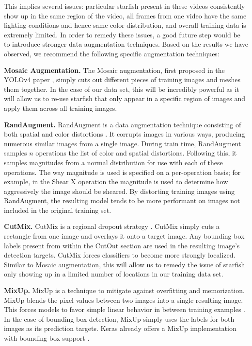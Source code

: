 \documentclass{article}
\begin{document}
This implies several issues: particular starfish present in these videos consistently show up in the same region of the video, all frames from one video have the same lighting conditions and hence same color distribution, and overall training data is extremely limited.
In order to remedy these issues, a good future step would be to introduce stronger data augmentation techniques.
Based on the results we have observed, we recommend the following specific augmentation techniques:

\textbf{Mosaic Augmentation.} The Mosaic augmentation, first proposed in the YOLOv4 paper \cite{yolov4}, simply cuts out different pieces of training images and meshes them together. In the case of our data set, this will be incredibly powerful as it will allow us to re-use starfish that only appear in a specific region of images and apply them across all training images.

\textbf{RandAugment.} RandAugment is a data augmentation technique consisting of both spatial and color distortions \cite{randaugment}. It corrupts images in various ways, producing numerous similar images from a single image.  During train time, RandAugment samples $n$ operations the list of color and spatial distortions.  Following this, it samples magnitudes from a normal distribution for use with each of these operations.  The way magnitude is used is specified on a per-operation basis; for example, in the Shear X operation the magnitude is used to determine how aggressively the image should be sheared.
By distorting training images using RandAugment, the resulting model tends to be more performant on images not included in the original training set.  

\textbf{CutMix.} CutMix is a regional dropout strategy \cite{cutmix}. CutMix simply cuts a rectangle from one image and overlays it onto a target image. Any bounding box labels present from within the CutOut section are used in the resulting image's detection targets. CutMix forces classifiers to become more strongly localized. Similar to Mosaic augmentation, this will allow us to remedy the issue of starfish only showing up in a limited number of locations in our training data set.

\textbf{MixUp.} MixUp is a technique to mitigate against overfitting and memorization. MixUp blends the pixel values between two images into a single resulting image. This forces models to favor simple linear behavior in between training examples \cite{mixup}. In the case of bounding box detection, MixUp simply uses the labels for both images as its prediction targets. Keras already offers a MixUp implementation with bounding box support \cite{wood2022kerascv}. 
\end{document}
